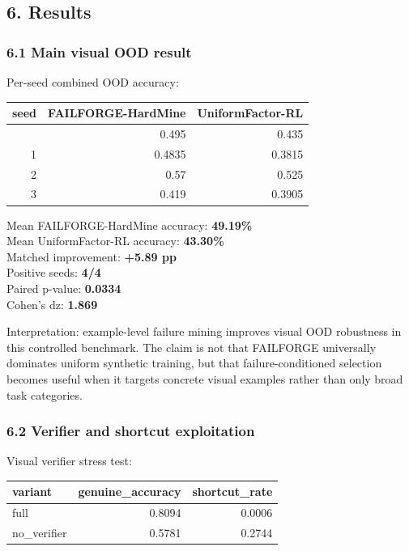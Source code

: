 \documentclass[
]{article}
\begin{document}
\subsection{6. Results}\label{results}

\subsubsection{6.1 Main visual OOD result}\label{main-visual-ood-result}

Per-seed combined OOD accuracy:

\begin{longtable}[]{@{}rrr@{}}
\toprule\noalign{}
seed & FAILFORGE-HardMine & UniformFactor-RL \\
\midrule\noalign{}
\endhead
\bottomrule\noalign{}
\endlastfoot
0 & 0.495 & 0.435 \\
1 & 0.4835 & 0.3815 \\
2 & 0.57 & 0.525 \\
3 & 0.419 & 0.3905 \\
\end{longtable}

Mean FAILFORGE-HardMine accuracy: \textbf{49.19\%}\\
Mean UniformFactor-RL accuracy: \textbf{43.30\%}\\
Matched improvement: \textbf{+5.89 pp}\\
Positive seeds: \textbf{4/4}\\
Paired p-value: \textbf{0.0334}\\
Cohen's dz: \textbf{1.869}

Interpretation: example-level failure mining improves visual OOD
robustness in this controlled benchmark. The claim is not that FAILFORGE
universally dominates uniform synthetic training, but that
failure-conditioned selection becomes useful when it targets concrete
visual examples rather than only broad task categories.

\subsubsection{6.2 Verifier and shortcut
exploitation}\label{verifier-and-shortcut-exploitation}

Visual verifier stress test:

\begin{longtable}[]{@{}lrr@{}}
\toprule\noalign{}
variant & genuine\_accuracy & shortcut\_rate \\
\midrule\noalign{}
\endhead
\bottomrule\noalign{}
\endlastfoot
full & 0.8094 & 0.0006 \\
no\_verifier & 0.5781 & 0.2744 \\
\end{longtable}
\end{document}
